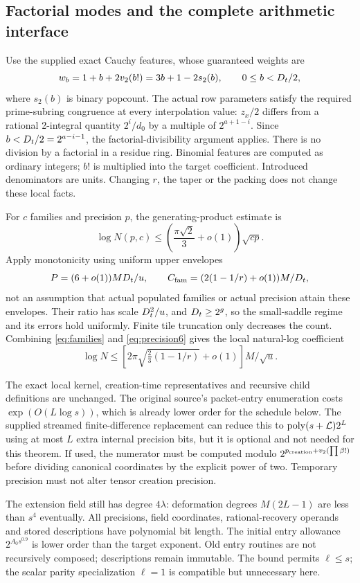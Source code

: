 \subsection{Factorial modes and the complete arithmetic interface}
Use the supplied exact Cauchy features, whose guaranteed weights are
\[
 w_b=1+b+2v_2(b!)=3b+1-2s_2(b),\qquad 0\le b<D_t/2,
\]
where $s_2(b)$ is binary popcount. The actual row parameters satisfy the required
prime-subring congruence at every interpolation value: $z_x/2$ differs from a rational
2-integral quantity $2^i/d_0$ by a multiple of $2^{a+1-i}$.
Since $b<D_t/2=2^{a-i-1}$, the factorial-divisibility argument applies.
There is no division by a factorial in a residue ring. Binomial features are computed
as ordinary integers; $b!$ is multiplied into the target coefficient. Introduced denominators
are units. Changing $r$, the taper or the packing does not change these local facts.

For $c$ families and precision $p$, the generating-product estimate is
\[
 \log N(p,c)\le\left(\frac{\pi\sqrt2}{3}+o(1)\right)\sqrt{cp}.
\]
Apply monotonicity using uniform upper envelopes
\[
 P=(6+o(1))MD_t/u,\qquad
 C_{\rm fam}=(2(1-1/r)+o(1))M/D_t,
\]
not an assumption that actual populated families or actual precision attain these envelopes.
Their ratio has scale $D_t^2/u$, and $D_t\ge2^g$, so the small-saddle regime and
its errors hold uniformly. Finite tile truncation only decreases the count. Combining
\eqref{eq:families} and \eqref{eq:precision6} gives the local natural-log coefficient
\begin{equation}\label{eq:localentropy}
 \log N\le\left[2\pi\sqrt{\tfrac23(1-1/r)}+o(1)\right]M/\sqrt u.
\end{equation}

The exact local kernel, creation-time representatives and recursive child definitions are
unchanged. The original source's packet-entry enumeration costs $\exp(O(L\log s))$,
which is already lower order for the schedule below. The supplied streamed finite-difference
replacement can reduce this to $\operatorname{poly}(s+\mathcal L)2^L$ using at most $L$ extra internal
precision bits, but it is optional and not needed for this theorem. If used, the numerator
must be computed modulo $2^{p_{\rm creation}+v_2(\prod\beta!)}$ before dividing canonical
coordinates by the explicit power of two. Temporary precision must not alter tensor creation precision.

The extension field still has degree $4\lambda$: deformation degrees $M(2L-1)$ are
less than $s^4$ eventually. All precisions, field coordinates, rational-recovery operands and
stored descriptions have polynomial bit length. The initial entry allowance
$2^{A_0s^{0.9}}$ is lower order than the target exponent. Old entry routines are not
recursively composed; descriptions remain immutable. The bound permits $\ell\le s$;
the scalar parity specialization $\ell=1$ is compatible but unnecessary here.

